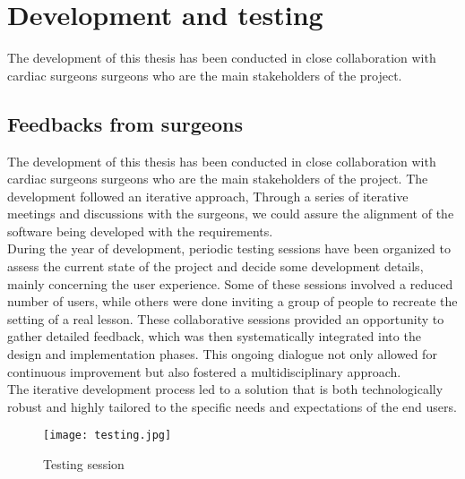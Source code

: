 \chapter{Development and testing}
\label{chp:testing}
\noindent
The development of this thesis has been conducted in close collaboration with cardiac surgeons surgeons who are the main stakeholders of the project.

\section{Feedbacks from surgeons}
\noindent
The development of this thesis has been conducted in close collaboration with cardiac surgeons surgeons who are the main stakeholders of the project.
The development followed an iterative approach, Through a series of iterative meetings and discussions with the surgeons, we could assure the alignment of the software being developed with the requirements.\\
During the year of development, periodic testing sessions have been organized to assess the current state of the project and decide some development details, mainly concerning the user experience. Some of these sessions involved a reduced number of users, while others were done inviting a group of people to recreate the setting of a real lesson.
These collaborative sessions provided an opportunity to gather detailed feedback, which was then systematically integrated into the design and implementation phases.
This ongoing dialogue not only allowed for continuous improvement but also fostered a multidisciplinary approach.\\
The iterative development process led to a solution that is both technologically robust and highly tailored to the specific needs and expectations of the end users.\\


\begin{figure}[ht]
  \centering
  \texttt{[image: testing.jpg]}
  \caption{Testing session}
  \label{fig:testing}
\end{figure}

